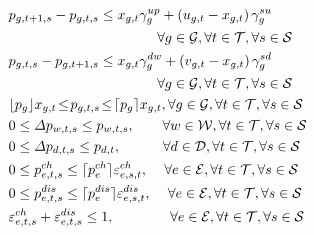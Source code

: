 \documentclass[lettersize,journal]{IEEEtran}
\begin{document}
\begin{subequations}
\begin{align}
		 & p_{g,t+1,s} - p_{g,t,s} \leq x_{g,t} \gamma_{g}^{up} + \left( u_{g,t} - x_{g,t} \right) \gamma_{g}^{su}\notag                                                                                                                             \\
		 & \qquad\qquad\qquad\qquad\qquad\,\,\,\, \forall g\in\mathcal{G},\forall t\in\mathcal{T},\forall s\in\mathcal{S}                                                                                                                            \\
		 & p_{g,t,s} - p_{g,t+1,s} \leq x_{g,t} \gamma_{g}^{dw} + \left( v_{g,t} - x_{g,t} \right) \gamma_{g}^{sd} \notag                                                                                                                            \\
		 & \qquad\qquad\qquad\qquad\qquad\,\,\,\, \forall g\in\mathcal{G},\forall t\in\mathcal{T},\forall s\in\mathcal{S}                                                                                                                            \\
		 & \lfloor p_{g} \rfloor x_{g,t} \!\leq\! p_{g,t,s} \!\leq\! \lceil p_{g} \rceil x_{g,t}, \forall g\in\mathcal{G}, \forall t\in\mathcal{T}, \forall s\in\mathcal{S}                                                                          \\
		 & 0 \leq \varDelta p_{w,t,s} \leq p_{w,t,s}, \quad\quad \forall w\in\mathcal{W}, \forall t\in\mathcal{T}, \forall s\in\mathcal{S}                                                                                                           \\
		 & 0 \leq \varDelta p_{d,t,s} \leq p_{d,t}, \quad\quad\quad \forall d\in\mathcal{D}, \forall t\in\mathcal{T}, \forall s\in\mathcal{S}                                                                                                        \\
		 & 0 \leq p_{e,t,s}^{ch} \leq \lceil p_{e}^{ch} \rceil  \varepsilon_{e,s,t}^{ch}, \,\quad \forall e\in\mathcal{E},\forall t\in\mathcal{T}, \forall s\in\mathcal{S}                                                                           \\
		 & 0 \leq p_{e,t,s}^{dis} \leq \lceil p_{e}^{dis} \rceil \varepsilon_{e,s,t}^{dis}, \,\quad \forall e\in\mathcal{E}, \forall t\in\mathcal{T}, \forall s\in\mathcal{S}                                                                        \\
		 & \varepsilon_{e,t,s}^{ch}+ \varepsilon_{e,t,s}^{dis}\leq 1, \quad\quad\qquad \forall e\in\mathcal{E}, \forall t\in\mathcal{T}, \forall s\in\mathcal{S}                                                                                     \\

\end{align}
\end{subequations}
\end{document}
